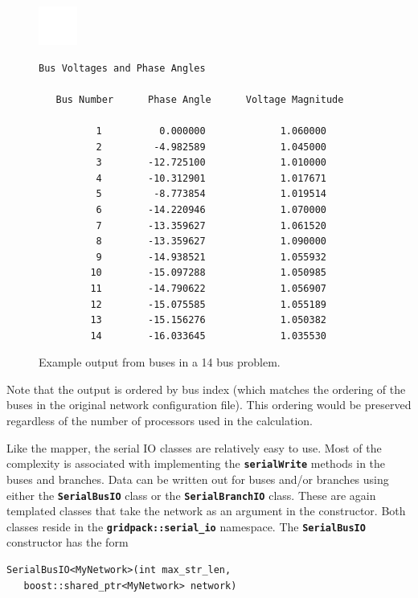 \documentclass[12pt]{report} %
\begin{document}
\begin{figure}
  \centering
    \includegraphics*[width=0.5in, height=0.5in, keepaspectratio=true]{20pix-white-square}

{
\color{red}
\bfseries
\begin{Verbatim}[commandchars=\\\{\}]
   Bus Voltages and Phase Angles

   Bus Number      Phase Angle      Voltage Magnitude

          1          0.000000             1.060000
          2         -4.982589             1.045000
          3        -12.725100             1.010000
          4        -10.312901             1.017671
          5         -8.773854             1.019514
          6        -14.220946             1.070000
          7        -13.359627             1.061520
          8        -13.359627             1.090000
          9        -14.938521             1.055932
         10        -15.097288             1.050985
         11        -14.790622             1.056907
         12        -15.075585             1.055189
         13        -15.156276             1.050382
         14        -16.033645             1.035530
\end{Verbatim}
}
  \caption{Example output from buses in a 14 bus problem.}
  \label{fig:fig-8}
\end{figure}

Note that the output is ordered by bus index (which matches the ordering of the buses in the original network configuration file). This ordering would be preserved regardless of the number of processors used in the calculation.

Like the mapper, the serial IO classes are relatively easy to use. Most of the complexity is associated with implementing the \texttt{\textbf{serialWrite}} methods in the buses and branches. Data can be written out for buses and/or branches using either the \texttt{\textbf{SerialBusIO}} class or the \texttt{\textbf{SerialBranchIO}} class. These are again templated classes that take the network as an argument in the constructor. Both classes reside in the \texttt{\textbf{gridpack::serial\_io}} namespace. The \texttt{\textbf{SerialBusIO}} constructor has the form

{
\color{red}
\begin{Verbatim}[fontseries=b]
SerialBusIO<MyNetwork>(int max_str_len,
   boost::shared_ptr<MyNetwork> network)
\end{Verbatim}
}
\end{document}

